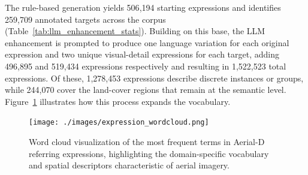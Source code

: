 The rule-based generation yields 506{,}194 starting expressions and identifies 259{,}709 annotated targets across the corpus (Table~\ref{tab:llm_enhancement_stats}). Building on this base, the LLM enhancement is prompted to produce one language variation for each original expression and two unique visual-detail expressions for each target, adding 496{,}895 and 519{,}434 expressions respectively and resulting in 1{,}522{,}523 total expressions. Of these, 1,278,453 expressions describe discrete instances or groups, while 244,070 cover the land-cover regions that remain at the semantic level. Figure~\ref{fig:expression_wordcloud} illustrates how this process expands the vocabulary.


\begin{figure}[!t]
\centering
\texttt{[image: ./images/expression\_wordcloud.png]}
\caption{Word cloud visualization of the most frequent terms in Aerial-D referring expressions, highlighting the domain-specific vocabulary and spatial descriptors characteristic of aerial imagery.}
\label{fig:expression_wordcloud}
\end{figure}

